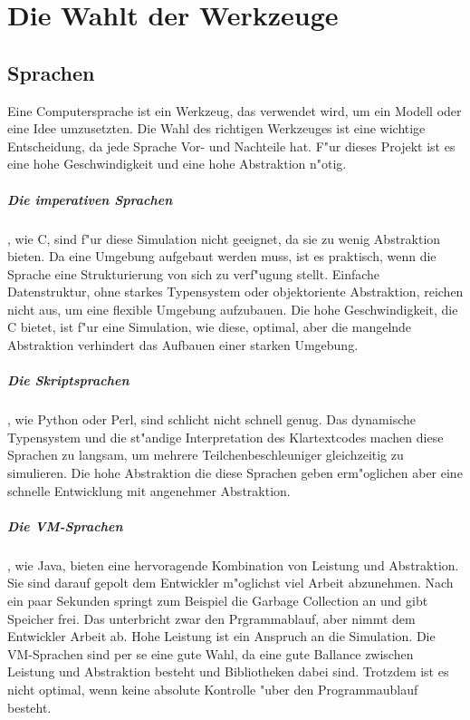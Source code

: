 \documentclass[14pt, a4paper]{report}
\begin{document}
\chapter{Die Wahlt der Werkzeuge}
\section{Sprachen}
Eine Computersprache ist ein Werkzeug, das verwendet wird, um ein Modell oder eine Idee
umzusetzten. Die Wahl des richtigen Werkzeuges ist eine wichtige Entscheidung, da jede
Sprache Vor- und Nachteile hat. F"ur dieses Projekt ist es eine hohe Geschwindigkeit 
und eine hohe Abstraktion n"otig.

\paragraph{Die imperativen Sprachen}, wie C, sind f"ur diese Simulation
nicht geeignet, da sie zu wenig Abstraktion bieten. Da eine Umgebung aufgebaut werden 
muss, ist es praktisch, wenn die Sprache eine Strukturierung von sich zu verf"ugung 
stellt. Einfache Datenstruktur, ohne starkes Typensystem oder objektoriente Abstraktion,
reichen nicht aus, um eine flexible Umgebung aufzubauen. Die hohe Geschwindigkeit, die
C bietet, ist f"ur eine Simulation, wie diese, optimal, aber die mangelnde Abstraktion
verhindert das Aufbauen einer starken Umgebung.

\paragraph{Die Skriptsprachen}, wie Python oder Perl, sind schlicht nicht schnell genug.
Das dynamische Typensystem und die st"andige Interpretation des Klartextcodes machen 
diese Sprachen zu langsam, um mehrere Teilchenbeschleuniger gleichzeitig zu 
simulieren. Die hohe Abstraktion die diese Sprachen geben erm"oglichen aber eine 
schnelle Entwicklung mit angenehmer Abstraktion.

\paragraph{Die VM-Sprachen}, wie Java, bieten eine hervoragende Kombination von 
Leistung und Abstraktion. Sie sind darauf gepolt dem Entwickler m"oglichst viel Arbeit
abzunehmen. Nach ein paar Sekunden springt zum Beispiel die Garbage Collection an und
gibt Speicher frei. Das unterbricht zwar den Prgrammablauf, aber nimmt dem Entwickler 
Arbeit ab. Hohe Leistung ist ein Anspruch an die Simulation. Die VM-Sprachen sind 
per se eine gute Wahl, da eine gute Ballance zwischen Leistung und Abstraktion besteht
und Bibliotheken dabei sind. Trotzdem ist es nicht optimal, wenn keine absolute 
Kontrolle "uber den Programmaublauf besteht.
\end{document}
